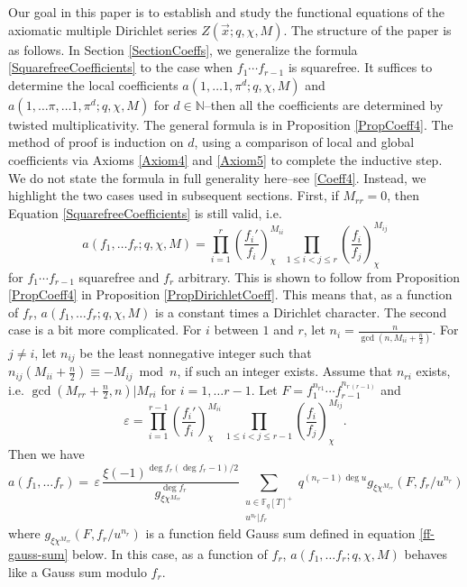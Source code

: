 \documentclass[11pt,letterpaper]{article}
\theoremstyle{definition}
\theoremstyle{remark}
\numberwithin{equation}{section}
\theoremstyle{dotless}
\newcommand{\N}{\mathbb {N}}
\newcommand{\F}{\mathbb{F}}
\newcommand{\res}[2]{\left(\frac{#1}{#2}\right)}
\begin{document}
Our goal in this paper is to establish and study the functional equations of the axiomatic multiple Dirichlet series $Z(\vec{x}; q, \chi, M)$. The structure of the paper is as follows. In Section \ref{SectionCoeffs}, we generalize the formula \eqref{SquarefreeCoefficients} to the case when $f_1\cdots f_{r-1}$ is squarefree. It suffices to determine the local coefficients $a(1, \ldots 1, \pi^d; q, \chi, M)$ and $a(1, \ldots \pi, \ldots 1, \pi^d; q, \chi, M)$ for $d \in \N$--then all the coefficients are determined by twisted multiplicativity. The general formula is in Proposition \ref{PropCoeff4}. The method of proof is induction on $d$, using a comparison of local and global coefficients via Axioms \ref{Axiom4} and \ref{Axiom5} to complete the inductive step. We do not state the formula in full generality here--see \eqref{Coeff4}. Instead, we highlight the two cases used in subsequent sections. First, if $M_{rr}=0$, then Equation \eqref{SquarefreeCoefficients} is still valid, i.e. 
\begin{equation*}
a(f_1, \ldots f_r; q, \chi, M) = \prod_{i=1}^{r} \res{f_i'}{f_i}_{\chi}^{M_{ii}} \prod_{1\leq i<j \leq r} \res{f_i}{f_j}_{\chi}^{M_{ij}}
\end{equation*}
for $f_1\cdots f_{r-1}$ squarefree and $f_r$ arbitrary. This is shown to follow from Proposition \ref{PropCoeff4} in Proposition \ref{PropDirichletCoeff}. This means that, as a function of $f_r$, $a(f_1, \ldots f_r; q, \chi, M)$ is a constant times a Dirichlet character. The second case is a bit more complicated. For $i$ between $1$ and $r$, let $n_i=\frac{n}{\gcd(n, M_{ii}+\tfrac{n}{2})}$. For $j\neq i$, let $n_{ij}$ be the least nonnegative integer such that $n_{ij}(M_{ii}+\tfrac{n}{2}) \equiv -M_{ij} \bmod n$, if such an integer exists. Assume that $n_{ri}$ exists, i.e. $\gcd(M_{rr}+\tfrac{n}{2}, n)|M_{ri}$ for $i=1, \ldots r-1$. Let $F=f_1^{n_{r1}}\cdots f_{r-1}^{n_{r \, (r-1)}}$ and 
\begin{equation*}
\varepsilon= \prod_{i=1}^{r-1} \res{f_i'}{f_i}_{\chi}^{M_{ii}} \, \prod_{1 \leq i < j \leq r-1} \res{f_i}{f_j}_{\chi}^{M_{ij}}.
\end{equation*}
Then we have
\begin{equation*}
a(f_1, \ldots f_r) = \, \varepsilon \, \frac{\xi(-1)^{\deg f_r(\deg f_r -1)/2}}{g_{\xi \chi^{M_{rr}}}^{\deg f_r}} \sum_{\substack{u \in \F_q[T]^+ \\ u^{n_r}|f_r}} q^{(n_r-1)\deg u} g_{\xi \chi^{M_{rr}}}(F, f_r/u^{n_r})
\end{equation*}
where $g_{\xi \chi^{M_{rr}}}(F, f_r/u^{n_r})$ is a function field Gauss sum defined in equation \eqref{ff-gauss-sum} below. In this case, as a function of $f_r$, $a(f_1, \ldots f_r; q, \chi, M)$ behaves like a Gauss sum modulo $f_r$. 
\end{document}
